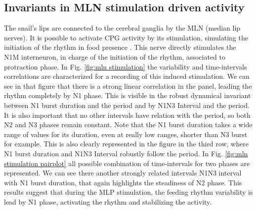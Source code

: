 \subsection{Invariants in MLN stimulation driven activity}
The snail's lips are connected to the cerebral ganglia by the MLN (median lip nerves). It is possible to activate CPG activity by its stimulation, simulating the initiation of the rhythm in food presence \parencite{staras_electrophysiological_2019}. This nerve directly stimulates the N1M interneuron, in charge of the initiation of the rhythm, associated to protraction phase. In Fig. \ref{fig:mln stimulation} the variability and time-intervals correlations are characterized for a recording of this induced stimulation. We can see in that figure that there is a strong linear correlation in the panel, leading the rhythm completely by N1 phase. This is visible in the robust dynamical invariant between N1 burst duration and the period and by N1N3 Interval and the period. It is also important that no other intervals have relation with the period, so both N2 and N3 phases remain constant. Note that the N1 burst duration takes a wide range of values for its duration, even at really low ranges, shorter than N3 burst for example. This is also clearly represented in the figure in the third row, where N1 burst duration and N1N3 Interval robustly follow the period. 
In Fig. \ref{fig:mln stimulation pairplot} all possible combination of time-intervals for two phases are represented. We can see there another strongly related intervals N1N3 interval with N1 burst duration, that again highlights the steadiness of N2 phase. 
This results suggest that during the MLP stimulation, the feeding rhythm variability is lead by N1 phase, activating the rhythm and stabilizing the activity. 


